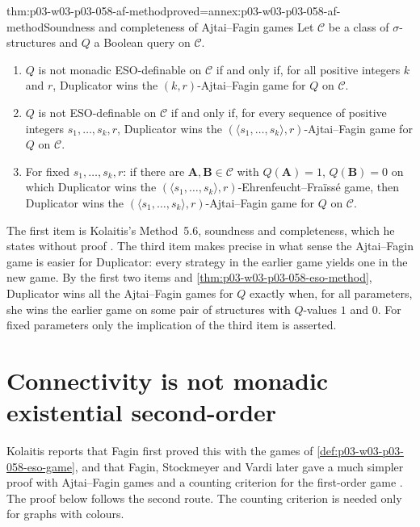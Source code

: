 \begin{hbtheorem}{thm:p03-w03-p03-058-af-method}{proved=annex:p03-w03-p03-058-af-method}{Soundness and completeness of Ajtai--Fagin games}
Let \(\mathcal C\) be a class of \(\sigma\)-structures and \(Q\) a Boolean
query on \(\mathcal C\).
\begin{enumerate}
\item \(Q\) is not monadic ESO-definable on \(\mathcal C\) if and only if,
      for all positive integers \(k\) and \(r\), Duplicator wins the
      \((k,r)\)-Ajtai--Fagin game for \(Q\) on \(\mathcal C\).
\item \(Q\) is not ESO-definable on \(\mathcal C\) if and only if, for every
      sequence of positive integers \(s_1,\ldots,s_k,r\), Duplicator wins
      the \((\langle s_1,\ldots,s_k\rangle,r)\)-Ajtai--Fagin game for \(Q\)
      on \(\mathcal C\).
\item For fixed \(s_1,\ldots,s_k,r\): if there are
      \(\mathbf A,\mathbf B\in\mathcal C\) with \(Q(\mathbf A)=1\),
      \(Q(\mathbf B)=0\) on which Duplicator wins the
      \((\langle s_1,\ldots,s_k\rangle,r)\)-Ehrenfeucht--Fra\"iss\'e game,
      then Duplicator wins the
      \((\langle s_1,\ldots,s_k\rangle,r)\)-Ajtai--Fagin game for \(Q\) on
      \(\mathcal C\).
\end{enumerate}
\end{hbtheorem}

The first item is Kolaitis's Method~5.6, soundness and completeness, which
he states without proof \cite[p.~28]{Kolaitis2003ExpressivePowerNotes}. The
third item makes precise in what sense the Ajtai--Fagin game is easier for
Duplicator: every strategy in the earlier game yields one in the new game.
By the first two items and \cref{thm:p03-w03-p03-058-eso-method}, Duplicator
wins all the Ajtai--Fagin games for \(Q\) exactly when, for all parameters,
she wins the earlier game on some pair of structures with \(Q\)-values
\(1\) and \(0\). For fixed parameters only the implication of the third
item is asserted.

\section{Connectivity is not monadic existential second-order}
\label{sec:p03-w03-p03-058-connectivity}

Kolaitis reports that Fagin first proved this with the games of
\cref{def:p03-w03-p03-058-eso-game}, and that Fagin, Stockmeyer and Vardi
later gave a much simpler proof with Ajtai--Fagin games and a counting
criterion for the first-order game
\cite[p.~28]{Kolaitis2003ExpressivePowerNotes}. The proof below follows the
second route. The counting criterion is needed only for graphs with
colours.


